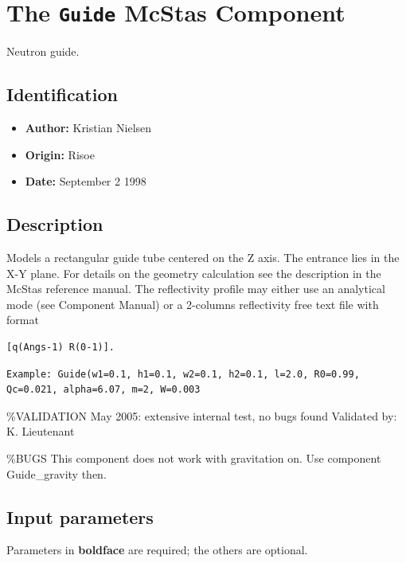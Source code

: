 \section{The \texttt{Guide} McStas Component}
Neutron guide.

\subsection*{Identification}
\begin{itemize}
  \item \textbf{Author:} Kristian Nielsen
  \item \textbf{Origin:} Risoe
  \item \textbf{Date:} September 2 1998
\end{itemize}

\subsection*{Description}
Models a rectangular guide tube centered on the Z axis. The entrance lies in the X-Y plane. For details on the geometry calculation see the description in the McStas reference manual. The reflectivity profile may either use an analytical mode (see Component Manual) or a 2-columns reflectivity free text file with format

\begin{verbatim}
[q(Angs-1) R(0-1)].
\end{verbatim}

\begin{verbatim}
Example: Guide(w1=0.1, h1=0.1, w2=0.1, h2=0.1, l=2.0, R0=0.99, Qc=0.021, alpha=6.07, m=2, W=0.003
\end{verbatim}

\%VALIDATION May 2005: extensive internal test, no bugs found Validated by: K. Lieutenant

\%BUGS This component does not work with gravitation on. Use component Guide\_gravity then.

\subsection*{Input parameters}
Parameters in \textbf{boldface} are required; the others are optional.


